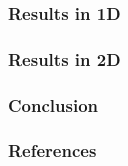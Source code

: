 \documentclass[t]{beamer}
\begin{document}
    \begin{frame}
        \frametitle{Results in 1D}
    
    \end{frame}

    \begin{frame}
        \frametitle{Results in 2D}
    
    \end{frame}

    \begin{frame}
        \frametitle{Conclusion}
    
    \end{frame}

    \begin{frame}
        \frametitle{References}
    
    \end{frame}
\end{document}
